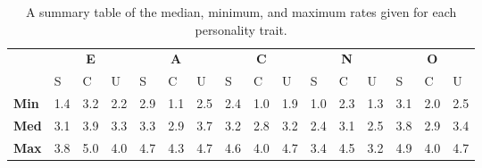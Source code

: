 \begin{table}[hbt!]
    \renewcommand{\arraystretch}{1}
    \begin{center}
        \begin{tabular}{p{}|
        p{}|p{}|p{}||
        p{}|p{}|p{}||
        p{}|p{}|p{}||
        p{}|p{}|p{}||
        p{}|p{}|p{}|}
            \cline{2-16}
            & \multicolumn{3}{c||}{\textbf{E}} & \multicolumn{3}{c||}{\textbf{A}}
            & \multicolumn{3}{c||}{\textbf{C}} &  \multicolumn{3}{c||}{\textbf{N}} & \multicolumn{3}{c|}{\textbf{O}} \\
            \cline{2-16}
            & S & C & U & S & C & U & S & C & U & S & C & U & S & C & U            \\
            \cline{2-16}
            \textbf{Min}    & 1.4 & 3.2 & 2.2 & 2.9 & 1.1 & 2.5 & 2.4 & 1.0 & 1.9 & 1.0 & 2.3 & 1.3 & 3.1 & 2.0 & 2.5 \\
            \textbf{Med}    & 3.1 & 3.9 & 3.3 & 3.3 & 2.9 & 3.7 & 3.2 & 2.8 & 3.2 & 2.4 & 3.1 & 2.5 & 3.8 & 2.9 & 3.4\\
            \textbf{Max}    & 3.8 & 5.0 & 4.0 & 4.7 & 4.3 & 4.7 & 4.6 & 4.0 & 4.7 & 3.4 & 4.5 & 3.2 & 4.9 & 4.0 & 4.7\\
            \cline{2-16}
        \end{tabular}
        \caption{A summary table of the median, minimum, and maximum rates given for each personality trait.}
        \label{table:medianMS1}
    \end{center}
\end{table}
